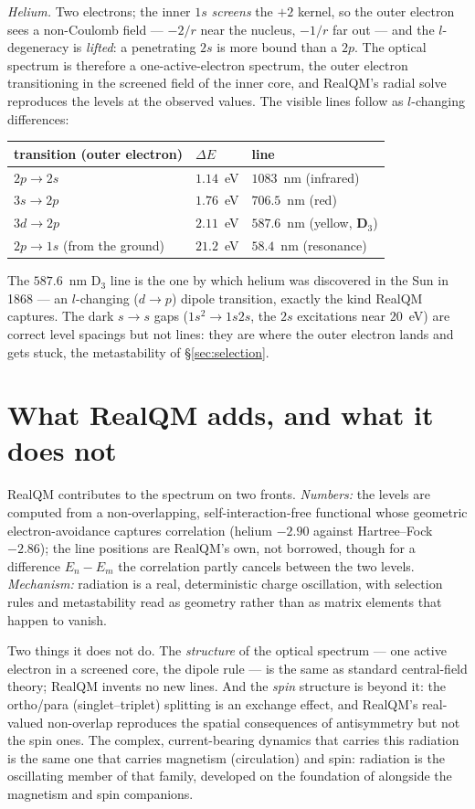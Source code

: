 \documentclass[11pt]{article}
\begin{document}
\emph{Helium.} Two electrons; the inner $1s$ \emph{screens} the $+2$ kernel, so the outer electron sees a
non-Coulomb field --- $-2/r$ near the nucleus, $-1/r$ far out --- and the $l$-degeneracy is \emph{lifted}: a
penetrating $2s$ is more bound than a $2p$. The optical spectrum is therefore a one-active-electron spectrum,
the outer electron transitioning in the screened field of the inner core, and RealQM's radial solve
reproduces the levels at the observed values. The visible lines follow as $l$-changing differences:
\begin{center}
\begin{tabular}{lll}
transition (outer electron) & $\Delta E$ & line \\ \hline
$2p\to2s$ & $1.14$~eV & $1083$~nm (infrared) \\
$3s\to2p$ & $1.76$~eV & $706.5$~nm (red) \\
$3d\to2p$ & $2.11$~eV & $587.6$~nm (yellow, \textbf{D$_3$}) \\
$2p\to1s$ (from the ground) & $21.2$~eV & $58.4$~nm (resonance) \\
\end{tabular}
\end{center}
The $587.6$~nm D$_3$ line is the one by which helium was discovered in the Sun in 1868 --- an $l$-changing
($d\to p$) dipole transition, exactly the kind RealQM captures. The dark $s\to s$ gaps ($1s^2\to1s2s$, the
$2s$ excitations near $20$~eV) are correct level spacings but not lines: they are where the outer electron
lands and gets stuck, the metastability of \S\ref{sec:selection}.

\section{What RealQM adds, and what it does not}
\label{sec:scope}

RealQM contributes to the spectrum on two fronts. \emph{Numbers:} the levels are computed from a
non-overlapping, self-interaction-free functional whose geometric electron-avoidance captures correlation
(helium $-2.90$ against Hartree--Fock $-2.86$); the line positions are RealQM's own, not borrowed, though for
a difference $E_n-E_m$ the correlation partly cancels between the two levels. \emph{Mechanism:} radiation is a
real, deterministic charge oscillation, with selection rules and metastability read as geometry rather than
as matrix elements that happen to vanish.

Two things it does not do. The \emph{structure} of the optical spectrum --- one active electron in a screened
core, the dipole rule --- is the same as standard central-field theory; RealQM invents no new lines. And the
\emph{spin} structure is beyond it: the ortho/para (singlet--triplet) splitting is an exchange effect, and
RealQM's real-valued non-overlap reproduces the spatial consequences of antisymmetry but not the spin ones.
The complex, current-bearing dynamics that carries this radiation is the same one that carries magnetism
(circulation) and spin: radiation is the oscillating member of that family, developed on the foundation of
\cite{ComplexRealQM} alongside the magnetism \cite{Magnetism} and spin \cite{Spinor} companions.
\end{document}
